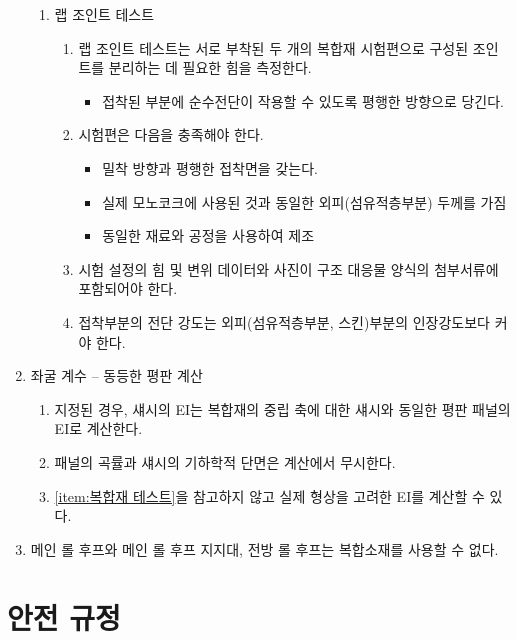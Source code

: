 \documentclass[final,a4paper,10pt]{report}
\begin{document}
\begin{enumerate}
\begin{enumerate}
      \item 랩 조인트 테스트
        \begin{enumerate}
          \item 랩 조인트 테스트는 서로 부착된 두 개의 복합재 시험편으로 구성된 조인트를 분리하는 데 필요한 힘을 측정한다.
            \begin{itemize}
                \item 접착된 부분에 순수전단이 작용할 수 있도록 평행한 방향으로 당긴다.
            \end{itemize}
            
          \item 시험편은 다음을 충족해야 한다.
            \begin{itemize}
                \item 밀착 방향과 평행한 접착면을 갖는다.
                \item 실제 모노코크에 사용된 것과 동일한 외피(섬유적층부분) 두께를 가짐
                \item 동일한 재료와 공정을 사용하여 제조
            \end{itemize}

          \item 시험 설정의 힘 및 변위 데이터와 사진이 구조 대응물 양식의 첨부서류에 포함되어야 한다.
          \item 접착부분의 전단 강도는 외피(섬유적층부분, 스킨)부분의 인장강도보다 커야 한다.
        \end{enumerate}
    \end{enumerate}

  \item 좌굴 계수 – 동등한 평판 계산
    \begin{enumerate}
      \item 지정된 경우, 섀시의 EI는 복합재의 중립 축에 대한 섀시와 동일한 평판 패널의 EI로 계산한다.
      \item 패널의 곡률과 섀시의 기하학적 단면은 계산에서 무시한다.
      \item \cref{item:복합재 테스트}을 참고하지 않고 실제 형상을 고려한 EI를 계산할 수 있다. 
    \end{enumerate}

  \item 메인 롤 후프와 메인 롤 후프 지지대, 전방 롤 후프는 복합소재를 사용할 수 없다.
\end{enumerate}

\chapter{안전 규정}
\end{document}
